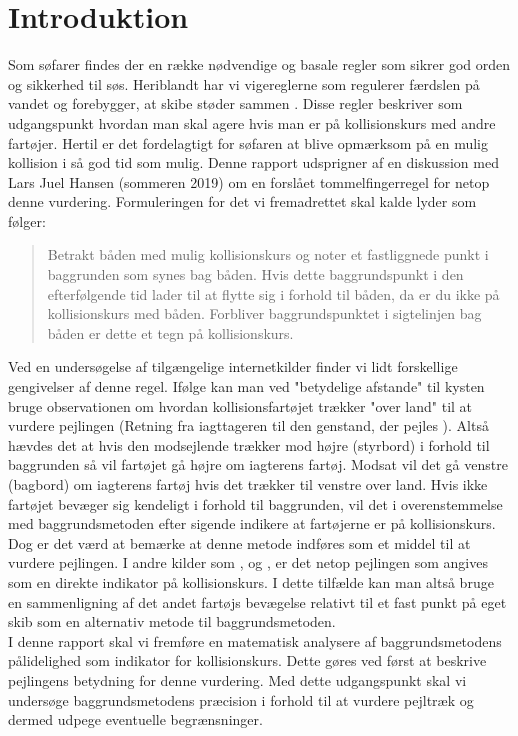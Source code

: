 \documentclass[%
 reprint,
nofootinbib,
aps,
]{revtex4-1}
\begin{document}
\twocolumngrid



\hfill
\clearpage


\section{Introduktion}
Som søfarer findes der en række nødvendige og basale regler som sikrer god orden og sikkerhed til søs. Heriblandt har vi vigereglerne som regulerer færdslen på vandet og forebygger, at skibe støder sammen \cite{respektforvand}. Disse regler beskriver som udgangspunkt hvordan man skal agere hvis man er på kollisionskurs med andre fartøjer. Hertil er det fordelagtigt for søfaren at blive opmærksom på en mulig kollision i så god tid som mulig. Denne rapport udsprigner af en diskussion med Lars Juel Hansen (sommeren 2019) om en forslået tommelfingerregel for netop denne vurdering. Formuleringen for det vi fremadrettet skal kalde  lyder som følger:
\begin{quote}
Betrakt båden med mulig kollisionskurs og noter et fastliggnede punkt i baggrunden som synes bag båden. Hvis dette baggrundspunkt i den efterfølgende tid lader til at flytte sig i forhold til båden, da er du ikke på kollisionskurs med båden. Forbliver baggrundspunktet i sigtelinjen bag båden er dette et tegn på kollisionskurs.
\end{quote}
Ved en undersøgelse af tilgængelige internetkilder finder vi lidt forskellige gengivelser af denne regel. Ifølge \cite{duelighed} kan man ved "betydelige afstande" til kysten bruge observationen om hvordan kollisionsfartøjet trækker "over land" til at vurdere pejlingen (Retning fra iagttageren til den genstand, der pejles \cite{ordbog}). Altså hævdes det at hvis den modsejlende trækker mod højre (styrbord) i forhold til baggrunden så vil fartøjet gå højre om iagterens fartøj. Modsat vil det gå venstre (bagbord) om iagterens fartøj hvis det trækker til venstre over land. Hvis ikke fartøjet bevæger sig kendeligt i forhold til baggrunden, vil det i overenstemmelse med baggrundsmetoden efter sigende indikere at fartøjerne er på kollisionskurs. Dog er det værd at bemærke at denne metode indføres som et middel til at vurdere pejlingen. I andre kilder som \cite{studienoter}, \cite{retsinformation} og \cite{groensund}, er det netop pejlingen som angives som en direkte indikator på kollisionskurs. I dette tilfælde kan man altså bruge en sammenligning af det andet fartøjs bevægelse relativt til et fast punkt på eget skib som en alternativ metode til baggrundsmetoden.
\\
I denne rapport skal vi fremføre en matematisk analysere af baggrundsmetodens pålidelighed som indikator for kollisionskurs. Dette gøres ved først at beskrive pejlingens betydning for denne vurdering. Med dette udgangspunkt skal vi undersøge baggrundsmetodens præcision i forhold til at vurdere pejltræk og dermed udpege eventuelle begrænsninger.
\end{document}
